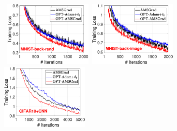 \documentclass[wcp]{jmlr}
\begin{document}
\begin{figure}[t]
\centering
\mbox{\hspace{-0.2in}
\includegraphics[width=1.75in]{simulation/fig2/M_rand_train_loss_no1.eps}\hspace{-0.1in}
\includegraphics[width=1.75in]{simulation/fig2/M_image_train_loss_no1.eps}\hspace{-0.1in}
\includegraphics[width=1.75in]{simulation/fig2/cifar_cnn_train_loss_no1.eps}
}


\end{figure}
\end{document}

